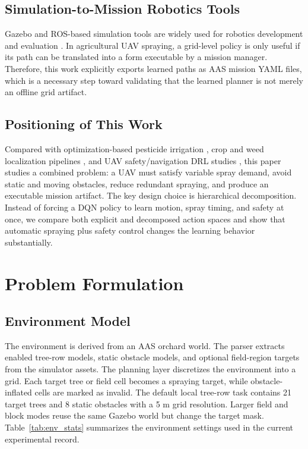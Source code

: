 \documentclass[conference,10pt]{IEEEtran}
\begin{document}
\subsection{Simulation-to-Mission Robotics Tools}
Gazebo and ROS-based simulation tools are widely used for robotics development and evaluation \cite{koenig2004gazebo,quigley2009ros}. In agricultural UAV spraying, a grid-level policy is only useful if its path can be translated into a form executable by a mission manager. Therefore, this work explicitly exports learned paths as AAS mission YAML files, which is a necessary step toward validating that the learned planner is not merely an offline grid artifact.

\subsection{Positioning of This Work}
Compared with optimization-based pesticide irrigation \cite{gao2021aco}, crop and weed localization pipelines \cite{ronchetti2020crop,vanessen2025weeds}, and UAV safety/navigation DRL studies \cite{singla2021memory,liao2025moving,carvalho2025qlearning}, this paper studies a combined problem: a UAV must satisfy variable spray demand, avoid static and moving obstacles, reduce redundant spraying, and produce an executable mission artifact. The key design choice is hierarchical decomposition. Instead of forcing a DQN policy to learn motion, spray timing, and safety at once, we compare both explicit and decomposed action spaces and show that automatic spraying plus safety control changes the learning behavior substantially.

\section{Problem Formulation}
\subsection{Environment Model}
The environment is derived from an AAS orchard world. The parser extracts enabled tree-row models, static obstacle models, and optional field-region targets from the simulator assets. The planning layer discretizes the environment into a grid. Each target tree or field cell becomes a spraying target, while obstacle-inflated cells are marked as invalid. The default local tree-row task contains 21 target trees and 8 static obstacles with a 5 m grid resolution. Larger field and block modes reuse the same Gazebo world but change the target mask. Table~\ref{tab:env_stats} summarizes the environment settings used in the current experimental record.
\end{document}
